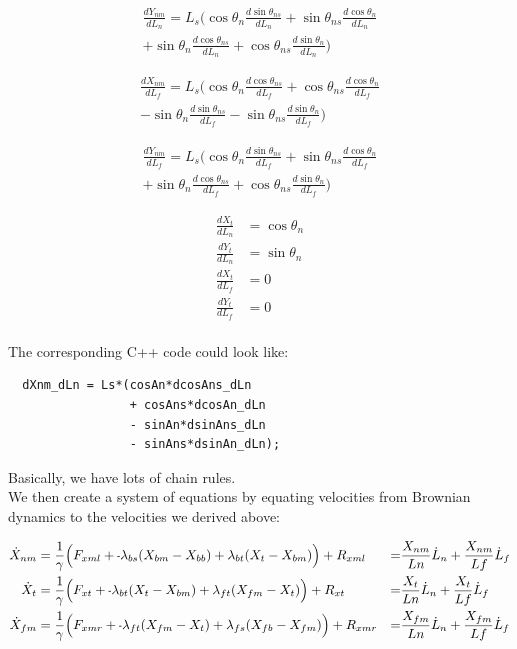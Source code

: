 \documentclass[11pt,twocolumn]{article}
\newcommand{\mn}{\scalebox{0.7}[1.0]{-}}
\begin{document}
\begin{multline}
  \frac{dY_{nm}}{dL_n} = L_s\Big(
  \cos\theta_n\frac{d\sin\theta_{ns}}{dL_n}
  + \sin\theta_{ns}\frac{d\cos\theta_{n}}{dL_n} \\
  + \sin\theta_n\frac{d\cos\theta_{ns}}{dL_n}
  + \cos\theta_{ns}\frac{d\sin\theta_{n}}{dL_n}
  \Big)
\end{multline}

\begin{multline}
  \frac{dX_{nm}}{dL_f} = L_s\Big(
  \cos\theta_n\frac{d\cos\theta_{ns}}{dL_f}
  + \cos\theta_{ns}\frac{d\cos\theta_{n}}{dL_f} \\
  - \sin\theta_n\frac{d\sin\theta_{ns}}{dL_f}
  - \sin\theta_{ns}\frac{d\sin\theta_{n}}{dL_f}
  \Big)
\end{multline}

\begin{multline}
  \frac{dY_{nm}}{dL_f} = L_s\Big(
  \cos\theta_n\frac{d\sin\theta_{ns}}{dL_f}
  + \sin\theta_{ns}\frac{d\cos\theta_{n}}{dL_f} \\
  + \sin\theta_n\frac{d\cos\theta_{ns}}{dL_f}
  + \cos\theta_{ns}\frac{d\sin\theta_{n}}{dL_f}
  \Big)
\end{multline}

\begin{align}
  \frac{dX_{t}}{dL_n} &= \cos\theta_n\\
  \frac{dY_{t}}{dL_n} &= \sin\theta_n\\
  \frac{dX_{t}}{dL_f} &= 0\\
  \frac{dY_{t}}{dL_f} &= 0\\
\end{align}

The corresponding C++ code could look like:
\begin{verbatim}
  dXnm_dLn = Ls*(cosAn*dcosAns_dLn
                 + cosAns*dcosAn_dLn
                 - sinAn*dsinAns_dLn
                 - sinAns*dsinAn_dLn);
\end{verbatim}
Basically, we have lots of chain rules.\\

We then create a system of equations by equating velocities from Brownian dynamics to the velocities
we derived above:

\onecolumn

\begin{align}
  \dot{X}_{nm} &= \frac{1}{\gamma} \Big(F_{xml} + \mn \lambda_{bs}(X_{bm} - X_{bb})
  + \lambda_{bt}(X_{t } - X_{bm}) \Big) + R_{xml}
  &=& \frac{X_{nm}}{Ln}\dot{L}_n + \frac{X_{nm}}{Lf}\dot{L}_f\\
  \dot{X}_{t } &= \frac{1}{\gamma} \Big(F_{xt } + \mn \lambda_{bt}(X_{t } - X_{bm})
  + \lambda_{ft}(X_{fm} - X_{t }) \Big) + R_{xt }
  &=& \frac{X_{t}}{Ln}\dot{L}_n + \frac{X_{t}}{Lf}\dot{L}_f\\
  \dot{X}_{fm} &= \frac{1}{\gamma} \Big(F_{xmr} + \mn \lambda_{ft}(X_{fm} - X_{t })
  + \lambda_{fs}(X_{fb} - X_{fm}) \Big) + R_{xmr}
  &=& \frac{X_{fm}}{Ln}\dot{L}_n + \frac{X_{fm}}{Lf}\dot{L}_f
\end{align}
\end{document}
